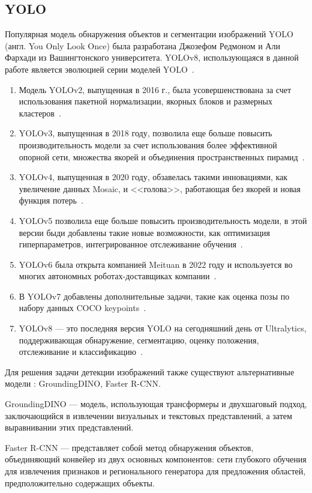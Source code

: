 \subsection{YOLO}

Популярная модель обнаружения объектов и сегментации изображений YOLO (англ. You Only Look Once) была разработана Джозефом Редмоном и Али Фархади из Вашингтонского университета. YOLOv8, использующаяся в данной работе является эволюцией серии моделей YOLO~\cite{YOLOv8}.
\begin{enumerate}
\item Модель YOLOv2, выпущенная в 2016 г., была усовершенствована за счет использования пакетной нормализации, якорных блоков и размерных кластеров~\cite{yolo_v2}.
\item YOLOv3, выпущенная в 2018 году, позволила еще больше повысить производительность модели за счет использования более эффективной опорной сети, множества якорей и объединения пространственных пирамид~\cite{yolo_v3}.
\item YOLOv4, выпущенная в 2020 году, обзавелась такими инновациями, как увеличение данных Mosaic, и <<голова>>, работающая без якорей и новая функция потерь~\cite{yolo_v4}.
\item YOLOv5 позволила еще больше повысить производительность модели, в этой версии быди добавлены такие новые возможности, как оптимизация гиперпараметров, интегрированное отслеживание обучения~\cite{yolo_v5}.
\item YOLOv6 была открыта компанией Meituan в 2022 году и используется во многих автономных роботах-доставщиках компании~\cite{yolo_v6}.
\item В YOLOv7 добавлены дополнительные задачи, такие как оценка позы по набору данных COCO keypoints~\cite{yolo_v7}.
\item YOLOv8 --- это последняя версия YOLO на сегодняшний день от Ultralytics, поддерживающая обнаружение, сегментацию, оценку положения, отслеживание и классификацию~\cite{YOLOv8}.
\end{enumerate}


Для решения задачи детекции изображений также существуют альтернативные модели \cite{object_detection_models}: GroundingDINO, Faster R-CNN.

GroundingDINO --- модель, использующая трансформеры  и двухшаговый подход, заключающийся в извлечении визуальных и текстовых представлений, а затем выравнивании этих представлений.

Faster R-CNN --- представляет собой метод обнаружения объектов, объединяющий конвейер из двух основных компонентов: сети глубокого обучения для извлечения признаков и регионального генератора для предложения областей, предположительно содержащих объекты.

